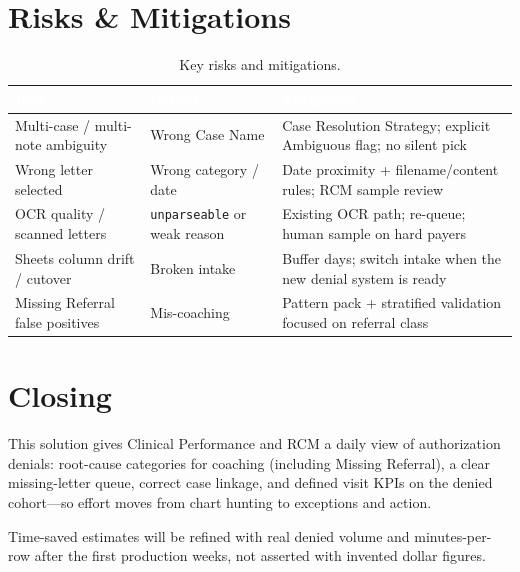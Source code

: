 \documentclass[11pt,a4paper]{article}
\begin{document}
\section{Risks \& Mitigations}

\begin{table}[h!]
\centering
\renewcommand{\arraystretch}{1.2}
\begin{tabularx}{\linewidth}{L{3.6cm} X X}
\toprule
{}
\textcolor{white}{\bfseries Risk} &
\textcolor{white}{\bfseries Impact} &
\textcolor{white}{\bfseries Mitigation} \\
\midrule
Multi-case / multi-note ambiguity &
Wrong Case Name &
Case Resolution Strategy; explicit Ambiguous flag; no silent pick \\
Wrong letter selected &
Wrong category / date &
Date proximity + filename/content rules; RCM sample review \\
OCR quality / scanned letters &
\texttt{unparseable} or weak reason &
Existing OCR path; re-queue; human sample on hard payers \\
Sheets column drift / cutover &
Broken intake &
Buffer days; switch intake when the new denial system is ready \\
Missing Referral false positives &
Mis-coaching &
Pattern pack + stratified validation focused on referral class \\
\bottomrule
\end{tabularx}
\caption{Key risks and mitigations.}
\end{table}


\section{Closing}

This solution gives Clinical Performance and RCM a daily view of authorization denials:
root-cause categories for coaching (including Missing Referral), a clear missing-letter
queue, correct case linkage, and defined visit KPIs on the denied cohort---so effort moves
from chart hunting to exceptions and action.

Time-saved estimates will be refined with real denied volume and minutes-per-row after the
first production weeks, not asserted with invented dollar figures.
\end{document}
